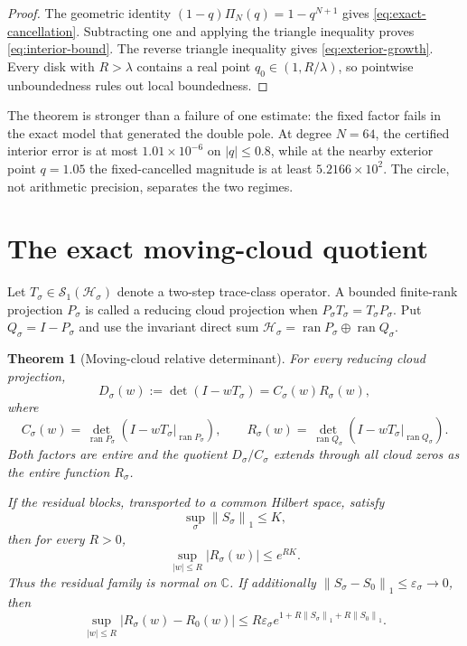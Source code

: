 \documentclass[11pt]{article}
\newtheorem{theorem}{Theorem}[section]
\theoremstyle{remark}
\newcommand{\norm}[1]{\left\lVert#1\right\rVert}
\newcommand{\C}{\mathbb C}
\newcommand{\cH}{\mathcal H}
\begin{document}
\begin{proof}
The geometric identity $(1-q)\Pi_N(q)=1-q^{N+1}$ gives
\eqref{eq:exact-cancellation}.  Subtracting one and applying the triangle
inequality proves \eqref{eq:interior-bound}.  The reverse triangle inequality
gives \eqref{eq:exterior-growth}.  Every disk with $R>\lambda$ contains a real
point $q_0\in(1,R/\lambda)$, so pointwise unboundedness rules out local
boundedness.
\end{proof}

The theorem is stronger than a failure of one estimate: the fixed factor
fails in the exact model that generated the double pole.  At degree $N=64$,
the certified interior error is at most $1.01\times10^{-6}$ on $|q|\le0.8$,
while at the nearby exterior point $q=1.05$ the fixed-cancelled magnitude is
at least $5.2166\times10^2$.  The circle, not arithmetic precision, separates
the two regimes.

\section{The exact moving-cloud quotient}

Let $T_\sigma\in\mathcal S_1(\cH_\sigma)$ denote a two-step trace-class
operator.  A bounded finite-rank projection $P_\sigma$ is called a reducing
cloud projection when $P_\sigma T_\sigma=T_\sigma P_\sigma$.  Put
$Q_\sigma=I-P_\sigma$ and use the invariant direct sum
$\cH_\sigma=\operatorname{ran}P_\sigma\oplus\operatorname{ran}Q_\sigma$.

\begin{theorem}[Moving-cloud relative determinant]
\label{thm:relative}
For every reducing cloud projection,
\begin{equation}
 D_\sigma(w):=\det(I-wT_\sigma)
 =C_\sigma(w)R_\sigma(w),
 \label{eq:block-factor}
\end{equation}
where
\[
 C_\sigma(w)=\det_{\operatorname{ran}P_\sigma}
  (I-wT_\sigma|_{\operatorname{ran}P_\sigma}),
 \qquad
 R_\sigma(w)=\det_{\operatorname{ran}Q_\sigma}
  (I-wT_\sigma|_{\operatorname{ran}Q_\sigma}).
\]
Both factors are entire and the quotient $D_\sigma/C_\sigma$ extends through
all cloud zeros as the entire function $R_\sigma$.

If the residual blocks, transported to a common Hilbert space, satisfy
\begin{equation}
 \sup_\sigma\norm{S_\sigma}_1\le K,
 \label{eq:uniform-complement}
\end{equation}
then for every $R>0$,
\begin{equation}
 \sup_{|w|\le R}|R_\sigma(w)|\le e^{RK}.
 \label{eq:normal-bound}
\end{equation}
Thus the residual family is normal on $\C$.  If additionally
$\norm{S_\sigma-S_0}_1\le\varepsilon_\sigma\to0$, then
\begin{equation}
 \sup_{|w|\le R}|R_\sigma(w)-R_0(w)|
 \le R\varepsilon_\sigma
 e^{1+R\norm{S_\sigma}_1+R\norm{S_0}_1}.
 \label{eq:relative-continuity}
\end{equation}
\end{theorem}
\end{document}

